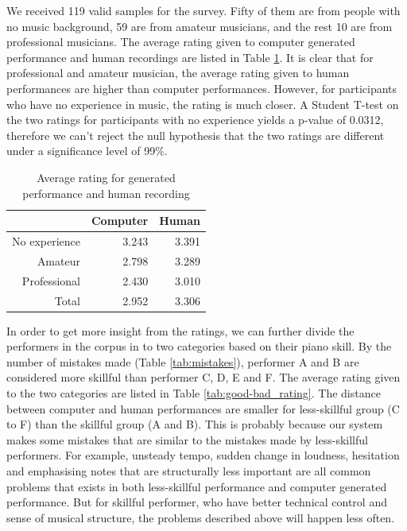 

We received 119 valid samples for the survey. Fifty of them are from people with no music background, 59 are from amateur musicians, and the rest 10 are from professional musicians. The average rating given to computer generated performance and human recordings are listed in Table \ref{tab:avg_rating}. It is clear that for professional and amateur musician, the average rating given to human performances are higher than computer performances. However, for participants who have no experience in music, the rating is much closer. A Student T-test on the two ratings for participants with no experience yields a p-value of 0.0312, therefore we can't reject the null hypothesis that the two ratings are different under a significance level of 99\%.

\begin{table}
   \centering
   \caption{Average rating for generated performance and human recording}
   \label{tab:avg_rating}
   \begin{tabular}{r|rr}
      \hline
      &Computer &Human \\
      \hline
      No experience&3.243&3.391\\
      Amateur&2.798&3.289\\
      Professional&2.430&3.010\\
      \hline
      Total&2.952&3.306\\
      \hline
   \end{tabular}
\end{table}

In order to get more insight from the ratings, we can further divide the performers in the corpus in to two categories based on their piano skill. By the number of mistakes made (Table \ref{tab:mistakes}), performer A and B are considered more skillful than performer C, D, E and F. The average rating given to the two categories are listed in Table \ref{tab:good-bad_rating}. The distance between computer and human performances are smaller for less-skillful group (C to F) than the skillful group (A and B). This is probably because our system makes some mistakes that are similar to the mistakes made by less-skillful performers. For example, unsteady tempo, sudden change in loudness, hesitation and emphasising notes that are structurally less important are all common problems that exists in both less-skillful performance and computer generated performance. But for skillful performer, who have better technical control and sense of musical structure, the problems described above will happen less often. %

